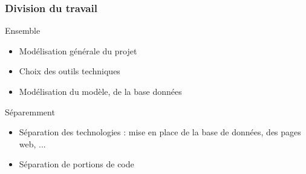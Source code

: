 
\begin{frame}
    \frametitle{Division du travail}
     \begin{block}{Ensemble}
      \begin{itemize}
       \item Modélisation générale du projet
       \item Choix des outils techniques
       \item Modélisation du modèle, de la base données
      \end{itemize}

     \end{block}
     \begin{block}{Séparemment}
      \begin{itemize}
       \item Séparation des technologies : mise en place de la base de données, des pages web, ...
       \item Séparation de portions de code
      \end{itemize}
     \end{block}
\end{frame}